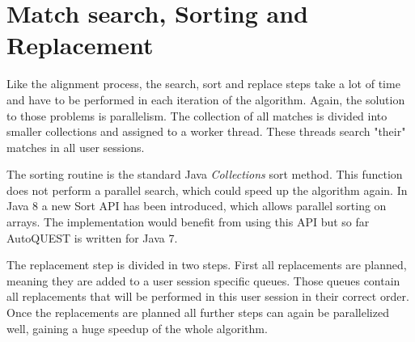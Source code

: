 \section{Match search, Sorting and Replacement}
Like the alignment process, the search, sort and replace steps take a lot of time and have to be performed in each iteration of the algorithm.
Again, the solution to those problems is parallelism. The collection of all matches is divided into smaller collections and assigned to a worker thread. These threads
search "their" matches in all user sessions.

The sorting routine is the standard Java \textit{Collections} sort method. This function does not perform a parallel search, which could speed up the algorithm again.
In Java 8 a new Sort API has been introduced, which allows parallel sorting on arrays. The implementation would  benefit from using this API but so far AutoQUEST is written for Java 7.

The replacement step is divided in two steps. First all replacements are planned, meaning they are added to a user session specific queues.
Those queues contain all replacements that will be performed in this user session in their correct order.
Once the replacements are planned all further steps can again be parallelized well, gaining a huge speedup of the whole algorithm.
